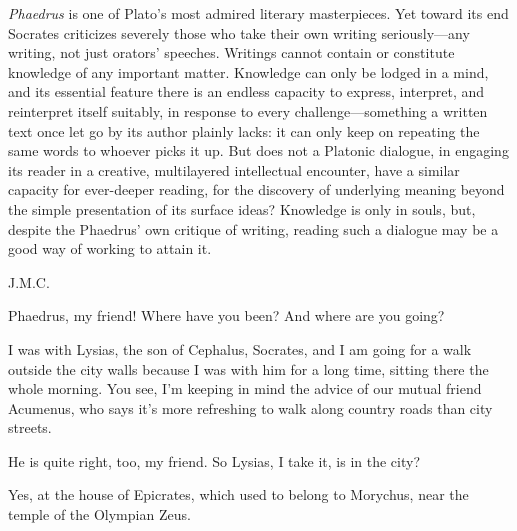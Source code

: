 {\em Phaedrus} is one of Plato’s most admired literary masterpieces. Yet
toward its end Socrates criticizes severely those who take their
own writing seriously---any writing, not just orators’ speeches.
Writings cannot contain or constitute knowledge of any important
matter. Knowledge can only be lodged in a mind, and its essential
feature there is an endless capacity to express, interpret, and
reinterpret itself suitably, in response to every challenge---something
a written text once let go by its author plainly lacks: it
can only keep on repeating the same words to whoever picks it
up. But does not a Platonic dialogue, in engaging its reader in a
creative, multilayered intellectual encounter, have a similar
capacity for ever-deeper reading, for the discovery of underlying
meaning beyond the simple presentation of its surface ideas?
Knowledge is only in souls, but, despite the Phaedrus’ own
critique of writing, reading such a dialogue may be a good way of
working to attain it.

\hfill J.M.C.\par
\stopchapter

\startchapter[title=Phaedrus]

\stopalignment
\blank[line]

\indent \saysocrates Phaedrus, my friend! Where have you been? And where are you 
going?

\sayphaedrus I was with Lysias, the son of Cephalus, Socrates, and I am going for a walk outside the city walls because I was with him for a long time, sitting there the whole morning. You see, I’m keeping in
mind the advice of our mutual friend Acumenus, who  says it’s more refreshing to walk along country roads than city streets.

\saysocrates He is quite right, too, my friend. So Lysias, I take it, is in
the city?

\sayphaedrus Yes, at the house of Epicrates, which used to belong to
Morychus, 
near the temple of the Olympian Zeus.

